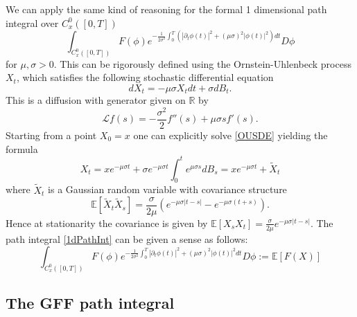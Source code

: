 \documentclass[11pt]{amsart}
\numberwithin{equation}{section}
\theoremstyle{definition}
\renewcommand{\tilde}{\widetilde}          %
\newcommand{\R}{\mathbb{R}}
\def\E{\mathbb{E}}
\newcommand{\pl}{\partial}
\begin{document}
We can apply the same kind of reasoning for the formal 1 dimensional path integral over $C^0_x([0,T])$ 
\begin{equation}\label{1dPathInt}
\int_{C^0_x([0,T])} F(\phi) e^{-\frac{1}{2 \sigma^2}\int_{0}^T( |\pl_t\phi(t)|^2+(\mu\sigma)^2|\phi (t)|^2) dt } D\phi
\end{equation}
for $\mu,\sigma>0$. This can be rigorously defined using the Ornstein-Uhlenbeck process $X_t$, which satisfies the following stochastic differential equation
\begin{equation}\label{OUSDE}
dX_t=-\mu \sigma X_t dt+ \sigma dB_t.
\end{equation}
This is a diffusion with generator given on $\R$ by
\begin{equation*}
\mathcal{L} f(s)=-\frac{\sigma^2}{2} f''(s)+ \mu \sigma s f'(s).
\end{equation*}
Starting from a point $X_0=x$ one can explicitly solve \eqref{OUSDE} yielding the formula
\begin{equation}\label{OUsolution}
X_t=x e^{-\mu \sigma t}+ \sigma e^{-\mu \sigma t} \int_0^t e^{ \mu \sigma s} dB_s= x e^{-\mu \sigma t}+ \tilde{X}_t
\end{equation} 
where $\tilde{X}_t$ is a Gaussian random variable with covariance structure
\begin{equation*}
\E[\tilde{X}_t \tilde{X}_s]= \frac{\sigma}{2 \mu} (e^{-\mu \sigma |t-s|}-e^{-\mu \sigma (t+s)} ).
\end{equation*}
Hence at stationarity the covariance is given by $\E[X_s X_t]= \frac{\sigma}{2\mu} e^{-\mu \sigma |t-s|}$.
The path integral \eqref{1dPathInt} can be given a sense as follows:
\[  \int_{C^0_x([0,T])} F(\phi) e^{-\frac{1}{2 \sigma^2}\int_{0}^T 
|\pl_t\phi(t)|^2+(\mu\sigma)^2 |\phi (t)|^2 dt } D\phi:= \E[F(X)]\]

\subsection{The GFF path integral}
\end{document}
